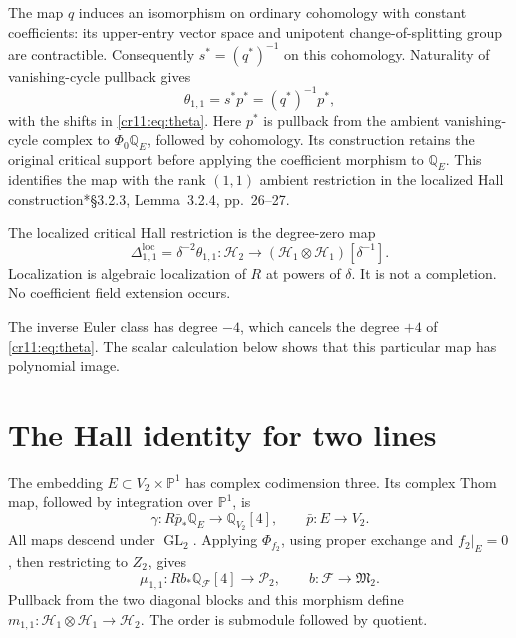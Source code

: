 The map $q$ induces an isomorphism on ordinary cohomology with constant
coefficients: its upper-entry vector space and unipotent change-of-splitting
group are contractible.
Consequently $s^*=(q^*)^{-1}$ on this cohomology.
Naturality of vanishing-cycle pullback gives
\[
 \theta_{1,1}=s^*p^*=(q^*)^{-1}p^*,
\]
with the shifts in \eqref{cr11:eq:theta}.
Here $p^*$ is pullback from the ambient vanishing-cycle complex to
$\Phi_0\mathbb Q_E$, followed by cohomology.
Its construction retains the original critical support before applying
the coefficient morphism to $\mathbb Q_E$.
This identifies the map with the rank $(1,1)$ ambient restriction
in the localized Hall construction\cite{cr11JKL}*{\S3.2.3, Lemma~3.2.4,
pp.~26--27}.

\begin{definition}
\label{cr11:def:delta}
The localized critical Hall restriction is the degree-zero map
\begin{equation}
 \Delta_{1,1}^{\mathrm{loc}}=\delta^{-2}\theta_{1,1}:
 \mathcal H_2\longrightarrow
       (\mathcal H_1\otimes\mathcal H_1)[\delta^{-1}].
 \label{cr11:eq:delta}
\end{equation}
Localization is algebraic localization of $R$ at powers of $\delta$.
It is not a completion. No coefficient field extension occurs.
\end{definition}

The inverse Euler class has degree $-4$, which cancels the degree
$+4$ of \eqref{cr11:eq:theta}.
The scalar calculation below shows that this particular map has
polynomial image.

\section{The Hall identity for two lines}
\label{cr11:sec:hall}

The embedding $E\subset V_2\times\mathbb P^1$ has complex codimension three.
Its complex Thom map, followed by integration over $\mathbb P^1$, is
\[
 \gamma:R\bar p_*\mathbb Q_E\longrightarrow\mathbb Q_{V_2}[4],
 \qquad \bar p:E\longrightarrow V_2.
\]
All maps descend under $\operatorname{GL}_2$.
Applying $\Phi_{f_2}$, using proper exchange and $f_2|_E=0$, then
restricting to $Z_2$, gives
\[
 \mu_{1,1}:Rb_*\mathbb Q_{\mathcal F}[4]\longrightarrow\mathcal P_2,
 \qquad b:\mathcal F\longrightarrow\mathfrak M_2.
\]
Pullback from the two diagonal blocks and this morphism define
$m_{1,1}:\mathcal H_1\otimes\mathcal H_1\to\mathcal H_2$.
The order is submodule followed by quotient.


